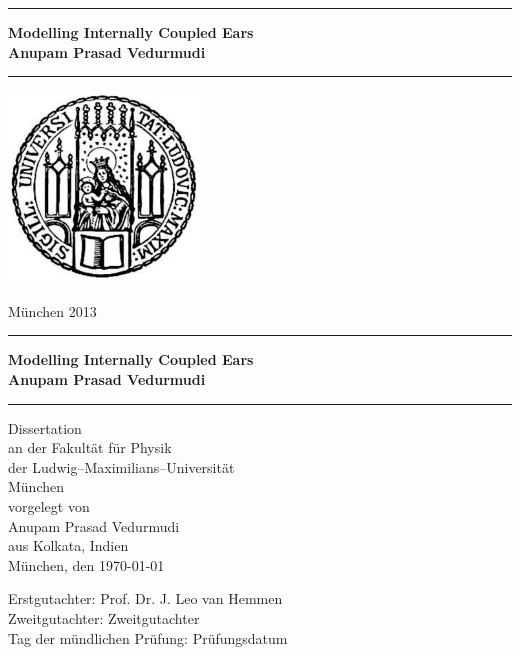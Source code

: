 \documentclass[12pt]{book}
\newcommand{\LMUTitle}[9]{
  \thispagestyle{empty}
  \vspace*{\stretch{1}}
  {\parindent0cm
   \rule{\linewidth}{.7ex}}
  \begin{flushright}

    \vspace*{\stretch{1}}
    \sffamily\bfseries\Huge
    #1\\
    \vspace*{\stretch{1}}
    \sffamily\bfseries\large
    #2
    \vspace*{\stretch{1}}
  \end{flushright}
  \rule{\linewidth}{.7ex}
  \vspace*{\stretch{5}}
  \begin{center}
    \includegraphics[width=2in]{siegel}
  \end{center}
  \vspace*{\stretch{1}}
  \begin{center}\sffamily\LARGE{#5}\end{center}
  \newpage
  \thispagestyle{empty}

  \cleardoublepage
  \thispagestyle{empty}

  \vspace*{\stretch{1}}
  {\parindent0cm
  \rule{\linewidth}{.7ex}}
  \begin{flushright}
    \vspace*{\stretch{1}}
    \sffamily\bfseries\Huge
    #1\\
    \vspace*{\stretch{1}}
    \sffamily\bfseries\large
    #2
    \vspace*{\stretch{1}}
  \end{flushright}
  \rule{\linewidth}{.7ex}

  \vspace*{\stretch{3}}
  \begin{center}
    \Large Dissertation\\
    \Large an der #4\\
    \Large der Ludwig--Maximilians--Universit\"{a}t\\
    \Large M\"unchen\\
    \vspace*{\stretch{1}}
    \Large vorgelegt von\\
    \Large #2\\
    \Large aus #3\\
    \vspace*{\stretch{2}}
    \Large M\"unchen, den #6
  \end{center}

  \newpage
  \thispagestyle{empty}

  \vspace*{\stretch{1}}

  \begin{flushleft}
    \large Erstgutachter:  #7 \\[1mm]
    \large Zweitgutachter: #8 \\[1mm]
    \large Tag der m\"{u}ndlichen Pr\"{u}fung: #9\\
  \end{flushleft}

  \cleardoublepage
}
\begin{document}
  \frontmatter


  \LMUTitle
      {Modelling Internally Coupled Ears
       }               %
      {Anupam Prasad Vedurmudi}                       %
      {Kolkata, Indien}                             %
      {Fakult\"{a}t f\"{u}r Physik}                         %
      {M\"{u}nchen 2013}                          %
      {\today}                            %
      {Prof. Dr. J. Leo van Hemmen}                          %
      {Zweitgutachter}                         %
      {Pr\"ufungsdatum}                         %


  \tableofcontents


  \listoffigures


  \listoftables
  \cleardoublepage


  


  \mainmatter\setcounter{page}{1}
  
  
  


  \backmatter
  
  \markboth{}{}


  


%  
\end{document}
